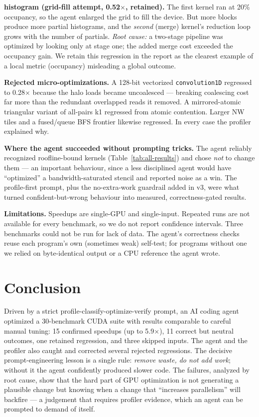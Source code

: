 \documentclass[conference]{IEEEtran}
\begin{document}
\textbf{histogram (grid-fill attempt, 0.52$\times$, retained).} The first kernel ran
at 20\% occupancy, so the agent enlarged the grid to fill the device. But more
blocks produce more partial histograms, and the \emph{second} (merge) kernel's
reduction loop grows with the number of partials. \emph{Root cause:} a two-stage
pipeline was optimized by looking only at stage one; the added merge cost exceeded
the occupancy gain. We retain this regression in the report as the clearest example
of a local metric (occupancy) misleading a global outcome.

\textbf{Rejected micro-optimizations.} A 128-bit vectorized
\texttt{convolution1D} regressed to 0.28$\times$ because the halo loads became
uncoalesced --- breaking coalescing cost far more than the redundant overlapped
reads it removed. A mirrored-atomic triangular variant of all-pairs k1 regressed
from atomic contention. Larger NW tiles and a fused/queue BFS frontier likewise
regressed. In every case the profiler explained why.

\textbf{Where the agent succeeded without prompting tricks.} The agent reliably
recognized roofline-bound kernels (Table~\ref{tab:all-results}) and chose
\emph{not} to change them --- an important behaviour, since a less disciplined
agent would have ``optimized'' a bandwidth-saturated stencil and reported noise as
a win. The profile-first prompt, plus the no-extra-work guardrail added in v3, were
what turned confident-but-wrong behaviour into measured, correctness-gated
results.

\textbf{Limitations.} Speedups are single-GPU and single-input. Repeated runs are
not available for every benchmark, so we do not report confidence intervals.
Three benchmarks could not be run for lack of data. The agent's correctness checks reuse
each program's own (sometimes weak) self-test; for programs without one we relied
on byte-identical output or a CPU reference the agent wrote.

\section{Conclusion}
Driven by a strict profile-classify-optimize-verify prompt, an AI coding agent
optimized a 30-benchmark CUDA suite with results comparable to careful manual
tuning: 15 confirmed speedups (up to 5.9$\times$), 11 correct but neutral
outcomes, one retained regression, and three skipped inputs. The agent and the
profiler also caught and corrected several rejected regressions. The decisive
prompt-engineering lesson is a single rule: \emph{remove waste, do not add work};
without it the agent confidently produced slower code. The failures, analyzed by
root cause, show that the hard part of GPU optimization is not generating a
plausible change but knowing when a change that ``increases parallelism'' will
backfire --- a judgement that requires profiler evidence, which an agent can be
prompted to demand of itself.
\end{document}
